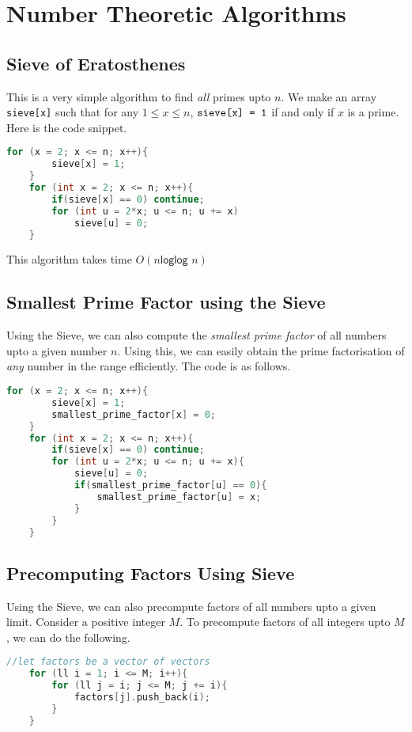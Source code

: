 \documentclass[12pt,a4paper]{amsart}
\numberwithin{equation}{section}
\theoremstyle{definition}
\begin{document}
\section{Number Theoretic Algorithms}

\subsection{Sieve of Eratosthenes} This is a very simple algorithm to find \textit{all} primes upto $n$. We make an array \verb|sieve[x]| such that for any $1\le x\le n$, $\verb|sieve[x] = 1|$ if and only if $x$ is a prime. Here is the code snippet. 

\begin{lstlisting}[language=C++]
    for (x = 2; x <= n; x++){
        sieve[x] = 1;
    }
    for (int x = 2; x <= n; x++){
        if(sieve[x] == 0) continue;
        for (int u = 2*x; u <= n; u += x)
            sieve[u] = 0;
    }
\end{lstlisting}
This algorithm takes time $O(n\textsf{loglog }n)$

\subsection{Smallest Prime Factor using the Sieve} Using the Sieve, we can also compute the \textit{smallest prime factor} of all numbers upto a given number $n$. Using this, we can easily obtain the prime factorisation of \textit{any} number in the range efficiently. The code is as follows. 

\begin{lstlisting}[language=C++]
    for (x = 2; x <= n; x++){
        sieve[x] = 1;
        smallest_prime_factor[x] = 0;
    }
    for (int x = 2; x <= n; x++){
        if(sieve[x] == 0) continue;
        for (int u = 2*x; u <= n; u += x){
            sieve[u] = 0;
            if(smallest_prime_factor[u] == 0){
                smallest_prime_factor[u] = x;
            }
        }
    }
\end{lstlisting}

\subsection{Precomputing Factors Using Sieve} Using the Sieve, we can also precompute factors of all numbers upto a given limit. Consider a positive integer $M$. To precompute factors of all integers upto $M$, we can do the following. 

\begin{lstlisting}[language=C++]
    //let factors be a vector of vectors
    for (ll i = 1; i <= M; i++){
        for (ll j = i; j <= M; j += i){
            factors[j].push_back(i);
        }
    }
\end{lstlisting}
\end{document}
